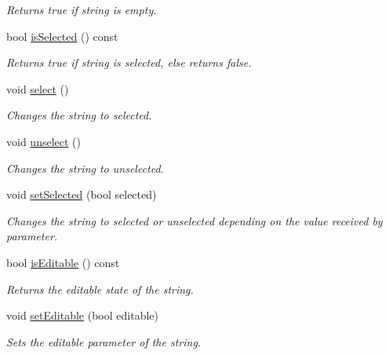 \begin{DoxyCompactItemize}
\begin{DoxyCompactList}\small\item\em Returns true if string is empty. \end{DoxyCompactList}\item 
bool \mbox{\hyperlink{classString_a3f5ffd092dd9870ae281b2e08d3b69dd}{is\+Selected}} () const
\begin{DoxyCompactList}\small\item\em Returns true if string is selected, else returns false. \end{DoxyCompactList}\item 
\mbox{\label{classString_ad575beeccbf4ae38bc5eab1ebfff3216}} 
void \mbox{\hyperlink{classString_ad575beeccbf4ae38bc5eab1ebfff3216}{select}} ()
\begin{DoxyCompactList}\small\item\em Changes the string to selected. \end{DoxyCompactList}\item 
\mbox{\label{classString_a26bc857fbf7077d23667cd0b1e9ecd6d}} 
void \mbox{\hyperlink{classString_a26bc857fbf7077d23667cd0b1e9ecd6d}{unselect}} ()
\begin{DoxyCompactList}\small\item\em Changes the string to unselected. \end{DoxyCompactList}\item 
void \mbox{\hyperlink{classString_a68737226a49a262c0a4952473788a77a}{set\+Selected}} (bool selected)
\begin{DoxyCompactList}\small\item\em Changes the string to selected or unselected depending on the value received by parameter. \end{DoxyCompactList}\item 
bool \mbox{\hyperlink{classString_a64c436144f008a40743c64b5094700bb}{is\+Editable}} () const
\begin{DoxyCompactList}\small\item\em Returns the editable state of the string. \end{DoxyCompactList}\item 
void \mbox{\hyperlink{classString_ae2ff38f8907c105ef577012a8db3f46e}{set\+Editable}} (bool editable)
\begin{DoxyCompactList}\small\item\em Sets the editable parameter of the string. \end{DoxyCompactList}\item 

\end{DoxyCompactItemize}
